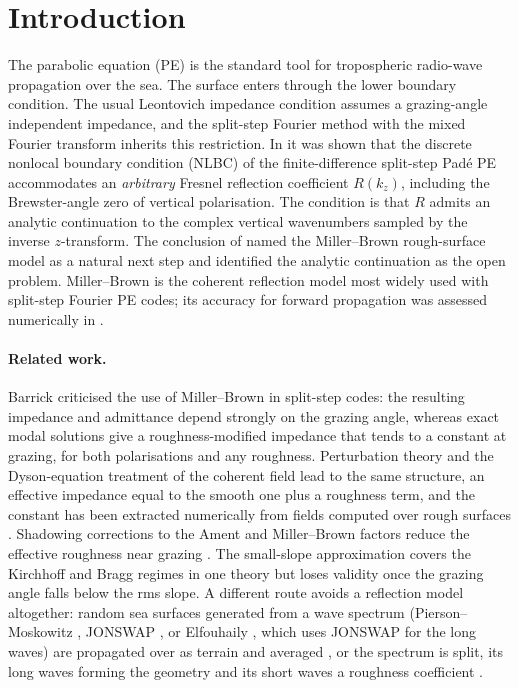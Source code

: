 \documentclass[11pt,a4paper]{article}
\newcommand{\kz}{k_z}
\begin{document}
\section{Introduction}

The parabolic equation (PE) is the standard tool for tropospheric radio-wave
propagation over the sea. The surface enters through the lower boundary
condition. The usual Leontovich impedance condition assumes a grazing-angle
independent impedance, and the split-step Fourier method with the mixed Fourier
transform inherits this restriction. In \cite{lytaev2022} it was shown that the
discrete nonlocal boundary condition (NLBC) of the finite-difference split-step
Pad\'e PE accommodates an \emph{arbitrary} Fresnel reflection coefficient
$R(\kz)$, including the Brewster-angle zero of vertical polarisation. The
condition is that $R$ admits an analytic continuation to the complex vertical
wavenumbers sampled by the inverse $z$-transform. The conclusion of
\cite{lytaev2022} named the Miller--Brown rough-surface model \cite{mbv1984} as a
natural next step and identified the analytic continuation as the open problem.
Miller--Brown is the coherent reflection model most widely used with
split-step Fourier PE codes; its accuracy for forward propagation was assessed
numerically in \cite{freund2006}.

\paragraph{Related work.}
Barrick \cite{barrick1998} criticised the use of Miller--Brown in split-step codes:
the resulting impedance and admittance depend strongly on the grazing angle,
whereas exact modal solutions give a roughness-modified impedance that tends to a
constant at grazing, for both polarisations and any roughness. Perturbation theory
\cite{barrick1971} and the Dyson-equation treatment of the coherent field
\cite{ishimaru2000} lead to the same structure, an effective impedance equal to the
smooth one plus a roughness term, and the constant has been extracted numerically
from fields computed over rough surfaces \cite{lai2004}. Shadowing corrections to the
Ament and Miller--Brown factors reduce the effective roughness near grazing
\cite{fabbro2006,song2024,zhao2025}. The small-slope approximation
\cite{voronovich1994} covers the Kirchhoff and Bragg regimes in one theory but loses
validity once the grazing angle falls below the rms slope. A different route
avoids a reflection model altogether: random sea surfaces generated from a wave
spectrum (Pierson--Moskowitz \cite{pm1964}, JONSWAP \cite{hasselmann1973}, or
Elfouhaily \cite{elfouhaily1997}, which uses JONSWAP for the long waves) are
propagated over as terrain and averaged \cite{gao2019,guo2020,ji2025}, or the
spectrum is split, its long waves forming the geometry and its short waves a
roughness coefficient \cite{bonnafont2024}.
\end{document}
